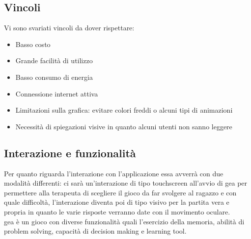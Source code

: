 \subsection{Vincoli} \label{subsec:vincoli}
Vi sono svariati vincoli da dover rispettare:
\begin{itemize}
\item Basso costo
\item Grande facilità di utilizzo
\item Basso consumo di energia
\item Connessione internet attiva
\item Limitazioni sulla grafica: evitare colori freddi o alcuni tipi di animazioni
\item Necessità di spiegazioni visive in quanto alcuni utenti non sanno leggere
\end{itemize}

\subsection{Interazione e funzionalità} \label{subsec:intfun}
Per quanto riguarda l'interazione con l'applicazione essa avverrà con due modalità differenti: ci sarà un'interazione di tipo touchscreen all'avvio di \acs{gea} per permettere alla terapeuta di scegliere il gioco da far svolgere al ragazzo e con quale difficoltà, l'interazione diventa poi di tipo visivo per la partita vera e propria in quanto le varie risposte verranno date con il movimento oculare.\\

\acs{gea} è un gioco con diverse funzionalità quali l'esercizio della memoria, abilità di problem solving, capacità di decision making e learning tool.


